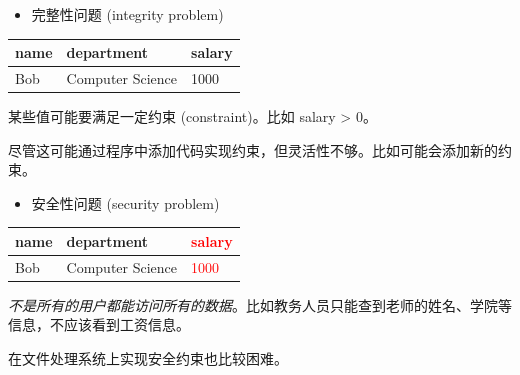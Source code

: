 \documentclass[aspectratio=169, 14pt]{beamer}
\begin{document}
\begin{frame}
	\begin{itemize}
		\item \alert{完整性问题
		      } (integrity problem)
	\end{itemize}

	\begin{table}
		\begin{tabular}{lll}
			\toprule
			name & department       & salary \\
			\midrule
			Bob  & Computer Science & 1000   \\
			\bottomrule
		\end{tabular}
	\end{table}
	某些值可能要满足一定约束 (constraint)。比如 salary > 0。

	尽管这可能通过程序中添加代码实现约束，但灵活性不够。比如可能会添加新的约束。
\end{frame}

\begin{frame}
	\begin{itemize}
		\item \alert{安全性问题
		      } (security problem)
	\end{itemize}
	\begin{table}
		\begin{tabular}{lll}
			\toprule
			name & department       & \textcolor{red}{salary} \\
			\midrule
			Bob  & Computer Science & \textcolor{red}{1000}   \\
			\bottomrule
		\end{tabular}
	\end{table}

	\emph{不是所有的用户都能访问所有的数据}。比如教务人员只能查到老师的姓名、学院等信息，不应该看到工资信息。

	在文件处理系统上实现安全约束也比较困难。
\end{frame}
\end{document}
